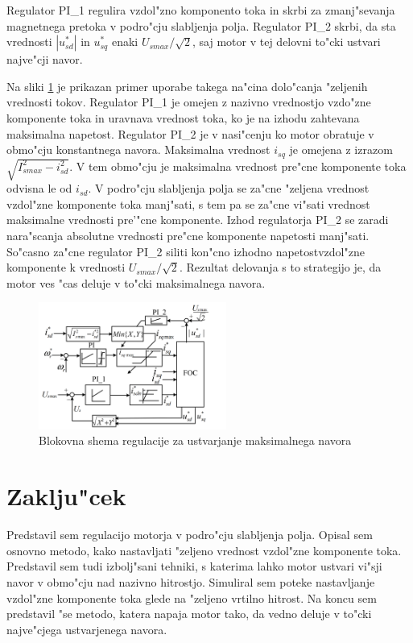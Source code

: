 \documentclass[journal,a4paper,twoside]{sty/IEEEtran}
\begin{document}
Regulator PI\_1 regulira vzdol"zno komponento toka in skrbi za zmanj"sevanja magnetnega pretoka v podro"cju slabljenja polja. Regulator PI\_2 skrbi, da sta vrednosti $|u_{sd}^*|$ in $u_{sq}^*$ enaki $U_{smax}/\sqrt{2}$, saj motor v tej delovni to"cki ustvari najve"cji navor.

Na sliki \ref{fig:MTPA_app} je prikazan primer uporabe takega na"cina dolo"canja "zeljenih vrednosti tokov. Regulator PI\_1 je omejen z nazivno vrednostjo vzdo"zne komponente toka in uravnava vrednost toka, ko je na izhodu zahtevana maksimalna napetost. Regulator PI\_2 je v nasi"cenju ko motor obratuje v obmo"cju konstantnega navora. Maksimalna vrednost $i_{sq}$ je omejena z izrazom $\sqrt{I_{smax}^2-i_{sd}^2}$. V tem obmo"cju je maksimalna vrednost pre"cne komponente toka odvisna le od $i_{sd}$. V podro"cju slabljenja polja se za"cne "zeljena vrednost vzdol"zne komponente toka manj"sati, s tem pa se za"cne vi"sati vrednost maksimalne vrednosti pre'"cne komponente. Izhod regulatorja PI\_2 se zaradi nara"scanja absolutne vrednosti pre"cne komponente napetosti manj"sati. So"casno za"cne regulator PI\_2 siliti kon"cno izhodno napetostvzdol"zne komponente k vrednosti $U_{smax}/\sqrt{2}$. Rezultat delovanja s to strategijo je, da motor ves "cas deluje v to"cki maksimalnega navora. \cite{MTPA}



\begin{figure}
\includegraphics[width=0.55\textwidth]{MTPA.png}

\caption{Blokovna shema regulacije za ustvarjanje maksimalnega navora\cite{MTPA}}
\label{fig:MTPA_app}
\end{figure}

\section{Zaklju"cek}

Predstavil sem regulacijo motorja v podro"cju slabljenja polja. Opisal sem osnovno metodo, kako nastavljati "zeljeno vrednost vzdol"zne komponente toka. Predstavil sem tudi izbolj"sani tehniki, s katerima lahko motor ustvari vi"sji navor v obmo"cju nad nazivno hitrostjo. Simuliral sem poteke nastavljanje vzdol"zne komponente toka glede na "zeljeno vrtilno hitrost. Na koncu sem predstavil "se metodo, katera napaja motor tako, da vedno deluje v to"cki najve"cjega ustvarjenega navora.
\end{document}
